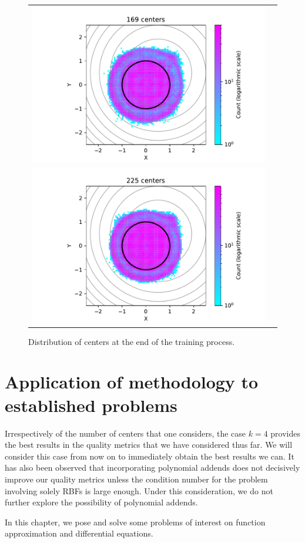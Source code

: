 \documentclass[12pt]{report} %
\begin{document}
\begin{figure}[h]
\begin{tabular}{cc}
    \includegraphics[width=.6\textwidth]{imagenes/experiments/2d/pde_parabola/circle_c169_pde_gaussian_kernel.pdf}   \\
    \includegraphics[width=.6\textwidth]{imagenes/experiments/2d/pde_parabola/circle_c225_pde_gaussian_kernel.pdf}
  \end{tabular}
  \caption{Distribution of centers at the end of the training process.}
  \label{fig:2d-pde-results-centers}
\end{figure}

\chapter{Application of methodology to established problems}\label{chap:application-to-established-problems}

Irrespectively of the number of centers that one considers, the case $k=4$ provides the best results in the quality metrics that we have considered thus far. We will consider this case from now on to immediately obtain the best results we can. It has also been observed that incorporating polynomial addends does not decisively improve our quality metrics unless the condition number for the problem involving solely RBFs is large enough. Under this consideration, we do not further explore the possibility of polynomial addends.

In this chapter, we pose and solve some problems of interest on function approximation and differential equations.
\end{document}
